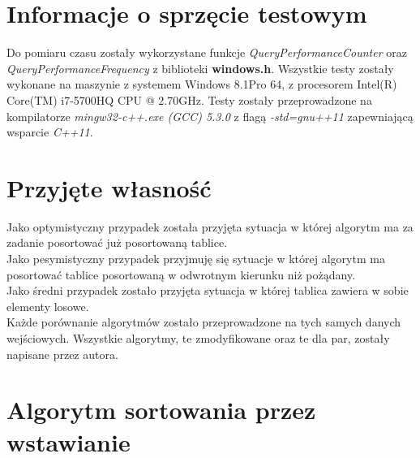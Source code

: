 
 \tableofcontents 
 
\section{Informacje o sprzęcie testowym}
Do pomiaru czasu zostały wykorzystane funkcje \textit{QueryPerformanceCounter} oraz \textit{QueryPerformanceFrequency} z biblioteki \textbf{windows.h}. Wszystkie testy zostały wykonane na maszynie z systemem Windows 8.1Pro 64, z procesorem Intel(R) Core(TM) i7-5700HQ CPU @ 2.70GHz. Testy zostały przeprowadzone na kompilatorze \textit{mingw32-c++.exe (GCC) 5.3.0} z flagą \textit{-std=gnu++11} zapewniającą wsparcie \textit{C++11}.
\section{Przyjęte własność}
Jako optymistyczny przypadek została przyjęta sytuacja w której algorytm ma za zadanie posortować już posortowaną tablice.\\
Jako pesymistyczny przypadek przyjmuję się sytuacje w której algorytm ma posortować tablice posortowaną w odwrotnym kierunku niż pożądany.\\
Jako średni przypadek zostało przyjęta sytuacja w której tablica zawiera w sobie elementy losowe.\\
 Każde porównanie algorytmów zostało przeprowadzone na tych samych danych wejściowych. Wszystkie algorytmy, te zmodyfikowane oraz te dla par, zostały napisane przez autora.
\section{Algorytm sortowania przez wstawianie}

